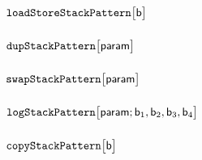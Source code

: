 \subsubsection{\oneOneSP{} \lispDone{}}                                                                         \label{hub: stack patterns: 1_1}              
\subsubsection{\twoOneSP{} \lispDone{}}                                                                         \label{hub: stack patterns: 2_1}              
\subsubsection{\threeOneSP{} \lispDone{}}                                                                       \label{hub: stack patterns: 3_1}              
\subsubsection{$\texttt{loadStore}\texttt{StackPattern}\big[\textsf{b}\big]$ \lispDone{}}                                                     \label{hub: stack patterns: load store}       
\subsubsection{$\texttt{dup}\texttt{StackPattern}\big[\textsf{param}\big]$ \lispDone{}}                                                       \label{hub: stack patterns: dup}              
\subsubsection{$\texttt{swap}\texttt{StackPattern}\big[\textsf{param}\big]$ \lispDone{}}                                                      \label{hub: stack patterns: swap}             
\subsubsection{$\texttt{log}\texttt{StackPattern}\big[\textsf{param}; \textsf{b}_{1}, \textsf{b}_{2}, \textsf{b}_{3}, \textsf{b}_{4} \big]$ \lispDone{}}  \label{hub: stack patterns: log}              
\subsubsection{$\texttt{copy}\texttt{StackPattern}\big[\textsf{b}\big]$ \lispDone{}}                                                          \label{hub: stack patterns: copy}             
